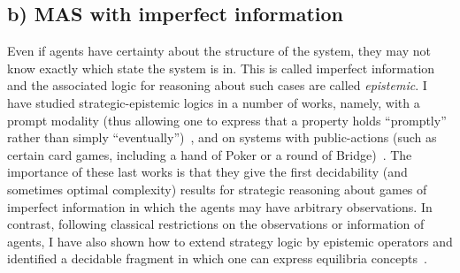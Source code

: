 \documentclass[10pt,a4paper,sans]{moderncv}
\begin{document}
\subsection{b) MAS with imperfect information}
Even if agents have certainty about the structure of the system, they may not know exactly which state the system is in. This is called imperfect information and the associated logic for reasoning about such cases are called \emph{epistemic}. I have studied strategic-epistemic logics in a number of works, namely, with a prompt modality (thus allowing one to express that a property holds ``promptly'' rather than simply ``eventually'')~\cite{DBLP:conf/kr/AminofMRZ16}, and on systems with public-actions (such as certain card games, including a hand of Poker or a round of Bridge)~\cite{BLMR17,BLMR17IJCAI}. The importance of these last works is that they give the first decidability (and sometimes optimal complexity) results for strategic reasoning about games of imperfect information in which the agents may have arbitrary observations. In contrast, following classical restrictions on the observations or information of agents, I have also shown how to extend strategy logic by epistemic operators and identified a decidable fragment in which one can express equilibria concepts~\cite{BLMR17IJCAI}.
\newline

\end{document}
